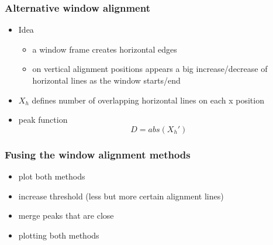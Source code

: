 \documentclass{beamer}
\begin{document}
\frame
{
	\frametitle{Alternative window alignment}
	\begin{itemize}
	\item <+-| alert@+> Idea
		\begin{itemize}
		\item <+-| alert@+> a window frame creates horizontal edges
		\item <+-| alert@+> on vertical alignment positions appears a big increase/decrease
		of horizontal lines as the window starts/end
		\end{itemize}
	\item <+-| alert@+> $X_{h}$ defines number of overlapping horizontal lines on each x position
	\item <+-| alert@+> peak function \[D = abs( X_{h}')\]
	\end{itemize}
}

\frame
{
}




\frame
{
	\frametitle{Fusing the window alignment methods}
	\begin{itemize}
	\item <+-| alert@+> plot both methods
	\item <+-| alert@+> increase threshold (less but more certain alignment lines)
	\item <+-| alert@+> merge peaks that are close
	\item <+-| alert@+> plotting both methods
	\end{itemize}
}

\frame
{
}


\frame
{
}

\frame
{
}
\end{document}
